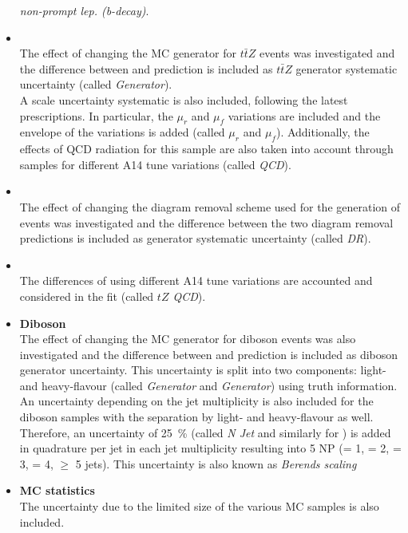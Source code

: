 \begin{itemize}
	\textit{\ttbar non-prompt lep. (b-decay)}. \\
	\item \textbf{\ttZ} \\
	The effect of changing the MC generator for $t\bar{t}Z$ events was
	investigated and the difference between \aMCatNLO and \Sherpa
	prediction is included as $t\bar{t}Z$ generator systematic
	uncertainty (called \textit{\ttZ Generator}). \\
	A scale uncertainty systematic is also included, following the
	latest prescriptions. In particular, the $\mu_r$ and $\mu_f$
	variations are included and the envelope of the variations is added 
	(called \textit{\ttZ $\mu_r$} and \textit{$\mu_f$}).
	Additionally, the effects of QCD radiation for this
	sample are also taken into account through samples for different A14
	tune variations (called \textit{\ttZ QCD}).\\
	\item \textbf{\tWZ} \\
	The effect of changing the diagram removal scheme used for the generation of \tWZ events was
	investigated and the difference between the two diagram removal
	predictions is included as \tWZ generator systematic uncertainty
	(called \textit{\tWZ DR}).\\
	\vspace{\baselineskip}
	\item \textbf{\tZq} \\
	The differences of using different A14
	tune variations are accounted and considered in the fit (called
	\textit{$tZ$ QCD}).\\
	\item \textbf{Diboson} \\
	The effect of changing the MC generator for diboson events was also
	investigated and the difference between \Sherpa and \PowhegBox
	prediction is included as diboson generator uncertainty. This
	uncertainty is split into two components: light- and heavy-flavour
	(called \textit{\VVLF Generator} and \textit{\VVHF Generator}) using truth information. \\
	An uncertainty depending on the jet multiplicity is also included for
	the diboson samples with the separation by light- and heavy-flavour as
	well. Therefore, an uncertainty of \SI{25}{\%} 
	(called \textit{\VVLF N Jet} and similarly for \VVHF) is added in quadrature
	per jet in each jet multiplicity resulting into 
	5 NP (= 1, = 2, = 3, = 4, $\geq$ 5 jets). This uncertainty is also known as \textit{Berends scaling} \\ 
	\item \textbf{MC statistics} \\ 
	The uncertainty due to the limited size of the various MC samples is also included.\\
\end{itemize}

